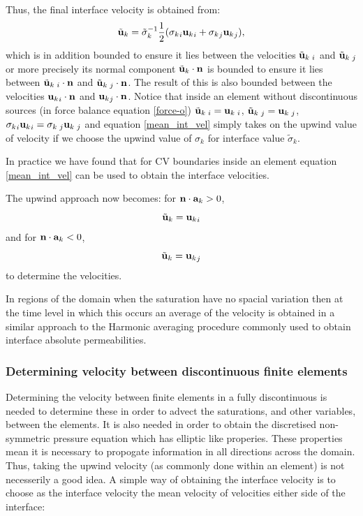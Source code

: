 Thus, the final interface velocity is obtained from:
\begin{equation}
{\tilde{\bf u}_k} = {\tilde\sigma_k}^{-1}  \frac{1}{2} ( {\sigma_k}_i {{\bf u}_k}_i + {\sigma_k}_j {{\bf u}_k}_j ),
\label{mean_int_vel}
\end{equation}
which is in addition bounded to ensure it lies between the velocities ${\tilde{\bf u}_k}\:_i$ and ${\tilde{\bf u}_k}\:_j$
or more precisely its normal component ${\tilde{\bf u}_k}\cdot {\bf n}$ is bounded to ensure it lies between
${\tilde{\bf u}_k}\:_i\cdot {\bf n}$ and ${\tilde{\bf{u}}_k}\:_j\cdot {\bf n}$.
The result of this is also bounded between the velocities
${{\bf u}_k}_i\cdot {\bf n}$ and ${{\bf u}_k}_j\cdot {\bf n}$.
Notice that inside an element without discontinuous sources (in force balance equation \ref{force-o}) ${\tilde{\bf u}_k}\:_i={{\bf u}_k}\:_i$, ${\tilde{\bf u}_k}\:_j={{\bf u}_k}\:_j$,
${\sigma_k}_i {{\bf u}_k}_i = {\sigma_k}\:_j {{\bf u}_k}\:_j $ and
equation \ref{mean_int_vel} simply takes on the upwind value of velocity if we choose the upwind value of $\sigma_k$ for
interface value $\tilde\sigma_k$.

In practice we have found that for CV boundaries inside an element equation \ref{mean_int_vel}
can be used to obtain the interface velocities.

The upwind approach now becomes:
for ${\bf n}\cdot {\bf a}_k>0$,
\begin{equation}
{\tilde{\bf u}_k} ={{\bf u}_k}_i
\end{equation}
and for ${\bf n}\cdot {\bf a}_k<0$,
\begin{equation}
{\tilde{\bf u}_k} ={{\bf u}_k}_j
\end{equation}
to determine the velocities.

In regions of the domain when the saturation have
no spacial variation then at the time level in which this occurs an average of the velocity
is obtained in a similar approach to the Harmonic averaging procedure commonly used to
obtain interface absolute permeabilities.


\subsubsection{Determining velocity between discontinuous finite elements}

Determining the velocity between finite elements in a fully discontinuous is needed
 to determine these in order to advect the saturations, and other variables,
between the elements. It is also needed in order to obtain the discretised
non-symmetric pressure equation which has elliptic like properies. These properties
mean it is necessary to propogate information in all directions across the domain.
Thus, taking the upwind velocity (as commonly done within an element) is not necesserily
a good idea.
A simple way of obtaining the interface velocity is to choose as the interface velocity the mean
velocity of velocities either side of the interface:

